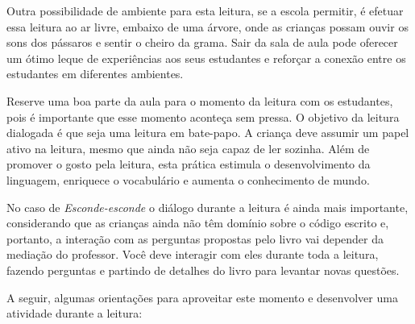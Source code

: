 \documentclass[11pt]{extarticle}
\begin{document}

Outra possibilidade de ambiente para esta leitura, se a escola permitir, 
é efetuar essa leitura ao ar livre, embaixo de uma árvore, onde as crianças 
possam ouvir os sons dos pássaros e sentir o cheiro da grama. Sair da sala 
de aula pode oferecer um ótimo leque de experiências aos seus estudantes e 
reforçar a conexão entre os estudantes em diferentes ambientes.  

Reserve uma boa parte da aula para o momento da leitura com os estudantes, 
pois é importante que esse momento aconteça sem pressa. O objetivo da 
leitura dialogada é que seja uma leitura em bate-papo. A criança deve 
assumir um papel ativo na leitura, mesmo que ainda não seja capaz de 
ler sozinha. Além de promover o gosto pela leitura, esta prática estimula 
o desenvolvimento da linguagem, enriquece o vocabulário e 
aumenta o conhecimento de mundo.

No caso de \textit{Esconde-esconde} o diálogo durante a leitura é 
ainda mais importante, considerando que as crianças ainda não têm domínio sobre o código escrito e, portanto, a interação com as perguntas propostas pelo livro vai depender da mediação do professor. 
Você deve interagir com eles durante toda a 
leitura, fazendo perguntas e partindo de detalhes do livro para 
levantar novas questões. 

A seguir, algumas orientações para aproveitar este momento e desenvolver uma atividade durante a leitura: 
\end{document}
